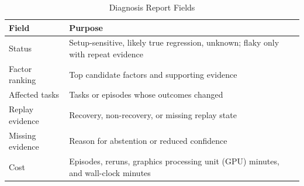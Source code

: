 \begin{table}[!t]
  \caption{Diagnosis Report Fields}
  \label{tab:report-fields}
  \centering
  \footnotesize
  \renewcommand{\arraystretch}{1.08}
  \begin{tabular}{@{}lp{}@{}}
    \toprule
    Field & Purpose \\
    \midrule
    Status & Setup-sensitive, likely true regression, unknown; flaky only with repeat evidence \\
    Factor ranking & Top candidate factors and supporting evidence \\
    Affected tasks & Tasks or episodes whose outcomes changed \\
    Replay evidence & Recovery, non-recovery, or missing replay state \\
    Missing evidence & Reason for abstention or reduced confidence \\
    Cost & Episodes, reruns, graphics processing unit (GPU) minutes, and wall-clock minutes \\
    \bottomrule
  \end{tabular}
\end{table}
